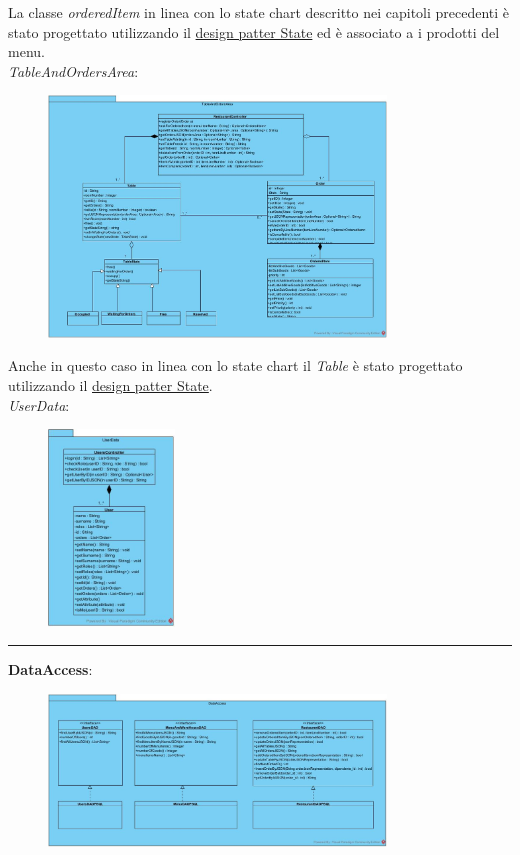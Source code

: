 La classe \textit{orderedItem} in linea con lo state chart descritto nei capitoli precedenti è stato progettato utilizzando il \underline{design patter State} ed è associato a i prodotti del menu.
\vspace{0.5cm}
\\\textit{TableAndOrdersArea}:
\begin{figure}[H]
	\centering
	\includegraphics[width=0.8\textwidth]{Immagini/TableAndOrdersArea.jpg}
\end{figure}
Anche in questo caso in linea con lo state chart il \textit{Table} è stato progettato utilizzando il \underline{design patter State}.
\vspace{0.5cm}
\\\textit{UserData}:
\begin{figure}[H]
	\centering
	\includegraphics[width=0.3\textwidth]{Immagini/UserData.jpg}
\end{figure}
\vspace{0.5cm}
\hrule
\vspace{0.5cm}
\textbf{DataAccess}:
\begin{figure}[H]
	\centering
	\includegraphics[width=0.8\textwidth]{Immagini/DataAccess.jpg}
\end{figure}
